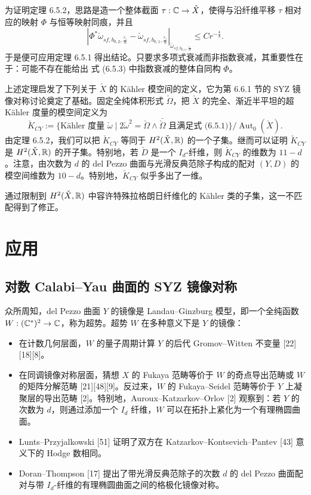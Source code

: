 为证明定理 6.5.2，思路是造一个整体截面 $\tau:\mathbb{C}\to\check X$，使得与沿纤维平移 $\tau$ 相对应的映射 $\Phi$ 与恒等映射同痕，并且
\begin{equation}
|\Phi^*\check\omega_{sf,b_{0,2},\frac{\varepsilon_i}{\alpha}}-\check\omega_{sf,b_{0,1},\frac{\varepsilon_i}{\alpha}}|_{\check\omega_{sf,b_{0,1},\frac{\varepsilon_i}{\alpha}}}\le Cr^{-\frac43}. \tag{6.5.3}
\end{equation}
于是便可应用定理 6.5.1 得出结论。只要求多项式衰减而非指数衰减，其重要性在于：可能不存在能给出 式 (6.5.3) 中指数衰减的整体自同构 $\Phi$。

上述定理启发了下列关于 $\check X$ 的 Kähler 模空间的定义，它为第 6.6.1 节的 SYZ 镜像对称讨论奠定了基础。固定全纯体积形式 $\check\Omega$，把 $\check X$ 的完全、渐近半平坦的超 Kähler 度量的模空间定义为
\[
\check K_{CY}:=\{\text{Kähler 度量 }\check\omega\mid 2\check\omega^2=\check\Omega\wedge\bar{\check\Omega}\text{ 且满足式 (6.5.1)}\}/\operatorname{Aut}_0(\check X).
\]
由定理 6.5.2，我们可以把 $\check K_{CY}$ 等同于 $H^2(\check X,\mathbb{R})$ 的一个子集。继而可以证明 $\check K_{CY}$ 是 $H^2(\check X,\mathbb{R})$ 的开子集。特别地，若 $\check D$ 是一个 $I_d$-纤维，则 $\check K_{CY}$ 的维数为 $11-d$。注意，由次数为 $d$ 的 del Pezzo 曲面与光滑反典范除子构成的配对 $(Y,D)$ 的模空间维数为 $10-d$。特别地，$\check K_{CY}$ 似乎多出了一维。

通过限制到 $H^2(\check X,\mathbb{R})$ 中容许特殊拉格朗日纤维化的 Kähler 类的子集，这一不匹配得到了修正。

\section{应用}

\subsection{对数 Calabi--Yau 曲面的 SYZ 镜像对称}

众所周知，del Pezzo 曲面 $Y$ 的镜像是 Landau--Ginzburg 模型，即一个全纯函数 $W:(\mathbb{C}^*)^2\to\mathbb{C}$，称为超势。超势 $W$ 在多种意义下是 $Y$ 的镜像：
\begin{itemize}
\item 在计数几何层面，$W$ 的量子周期计算 $Y$ 的后代 Gromov--Witten 不变量 [22][18][8]。
\item 在同调镜像对称层面，猜想 $X$ 的 Fukaya 范畴等价于 $W$ 的奇点导出范畴或 $W$ 的矩阵分解范畴 [21][48][9]。反过来，$W$ 的 Fukaya--Seidel 范畴等价于 $Y$ 上凝聚层的导出范畴 [2]。特别地，Auroux--Katzarkov--Orlov [2] 观察到：若 $Y$ 的次数为 $d$，则通过添加一个 $I_d$ 纤维，$W$ 可以在拓扑上紧化为一个有理椭圆曲面。
\item Lunts--Przyjalkowski [51] 证明了双方在 Katzarkov--Kontsevich--Pantev [43] 意义下的 Hodge 数相同。
\item Doran--Thompson [17] 提出了带光滑反典范除子的次数 $d$ 的 del Pezzo 曲面配对与带 $I_d$-纤维的有理椭圆曲面之间的格极化镜像对称。
\end{itemize}

